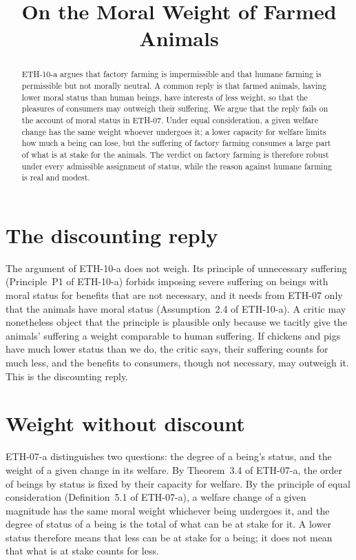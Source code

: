 \documentclass{situationist-preprint}
\title{On the Moral Weight of Farmed Animals}
\begin{document}
\maketitle

\begin{abstract}
ETH-10-a argues that factory farming is impermissible and that humane farming is permissible but not morally neutral. A common reply is that farmed animals, having lower moral status than human beings, have interests of less weight, so that the pleasures of consumers may outweigh their suffering. We argue that the reply fails on the account of moral status in ETH-07. Under equal consideration, a given welfare change has the same weight whoever undergoes it; a lower capacity for welfare limits how much a being can lose, but the suffering of factory farming consumes a large part of what is at stake for the animals. The verdict on factory farming is therefore robust under every admissible assignment of status, while the reason against humane farming is real and modest.
\end{abstract}

\section{The discounting reply}

The argument of ETH-10-a does not weigh. Its principle of unnecessary suffering (Principle~P1 of ETH-10-a) forbids imposing severe suffering on beings with moral status for benefits that are not necessary, and it needs from ETH-07 only that the animals have moral status (Assumption~2.4 of ETH-10-a). A critic may nonetheless object that the principle is plausible only because we tacitly give the animals' suffering a weight comparable to human suffering. If chickens and pigs have much lower status than we do, the critic says, their suffering counts for much less, and the benefits to consumers, though not necessary, may outweigh it. This is the discounting reply.

\section{Weight without discount}

ETH-07-a distinguishes two questions: the degree of a being's status, and the weight of a given change in its welfare. By Theorem~3.4 of ETH-07-a, the order of beings by status is fixed by their capacity for welfare. By the principle of equal consideration (Definition~5.1 of ETH-07-a), a welfare change of a given magnitude has the same moral weight whichever being undergoes it, and the degree of status of a being is the total of what can be at stake for it. A lower status therefore means that less can be at stake for a being; it does not mean that what is at stake counts for less.
\end{document}
